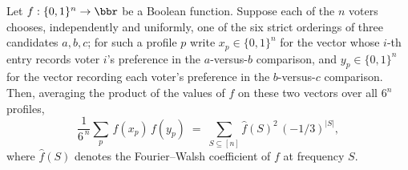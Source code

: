 \begin{lemma}
\label{ArrowTheorem.expected_product_eq_corrFunc}
\leanok
{}
Let $f:\{0,1\}^n\to\bbr$ be a Boolean function. Suppose each of the $n$ voters chooses,
independently and uniformly, one of the six strict orderings of three candidates
$a,b,c$; for such a profile $p$ write $x_p\in\{0,1\}^n$ for the vector whose $i$-th
entry records voter $i$'s preference in the $a$-versus-$b$ comparison, and
$y_p\in\{0,1\}^n$ for the vector recording each voter's preference in the $b$-versus-$c$
comparison. Then, averaging the product of the values of $f$ on these two vectors over
all $6^n$ profiles,
\[
  \frac{1}{6^{\,n}}\sum_{p}\, f(x_p)\,f(y_p)
  \;=\; \sum_{S\subseteq[n]} \hat f(S)^2\,(-1/3)^{|S|},
\]
where $\hat f(S)$ denotes the Fourier--Walsh coefficient of $f$ at frequency $S$.
\end{lemma}

